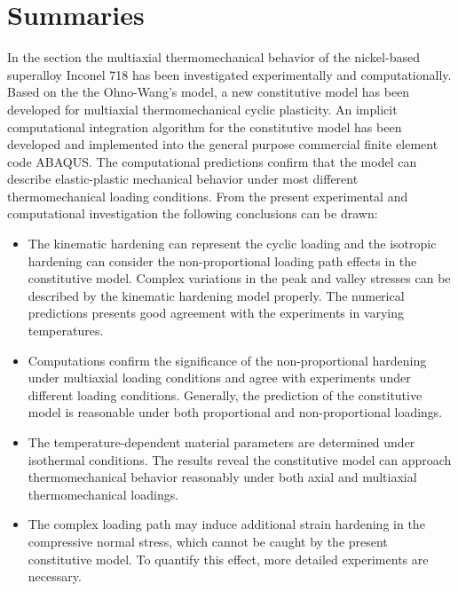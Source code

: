 \section{Summaries}
\noindent
In the section the multiaxial thermomechanical behavior of the nickel-based superalloy Inconel 718 has been investigated experimentally and computationally.
Based on the the Ohno-Wang's model, a new constitutive model has been developed for multiaxial thermomechanical cyclic plasticity.
An implicit computational integration algorithm for the constitutive model has been developed and implemented into the general purpose commercial finite element code ABAQUS. The computational predictions confirm that the model can describe elastic-plastic mechanical behavior under most different thermomechanical loading conditions.
From the present experimental and computational investigation the following conclusions can be drawn:
\begin{itemize}

\item {The kinematic hardening can represent the cyclic loading and the isotropic hardening can consider the non-proportional loading path effects in the constitutive model.
Complex variations in the peak and valley stresses can be described by the kinematic hardening model properly. The numerical predictions presents good agreement with the experiments in varying temperatures.}

\item {Computations confirm the significance of the non-proportional hardening under multiaxial loading conditions and agree with experiments under different loading conditions. Generally, the prediction of the constitutive model is reasonable under both proportional and non-proportional loadings.}

\item {The temperature-dependent material parameters are determined under isothermal conditions. The results reveal the constitutive model can approach thermomechanical behavior reasonably under both axial and multiaxial thermomechanical loadings.}

\item{The complex loading path may induce additional strain hardening in the compressive normal stress, which cannot be caught by the present constitutive model. To quantify this effect, more detailed experiments are necessary.} 

\end{itemize}